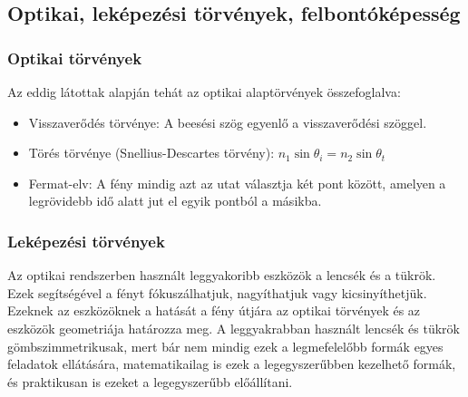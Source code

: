 \documentclass[../main.tex]{subfiles}
\begin{document}
\subsection{Optikai, leképezési törvények, felbontóképesség}
\subsubsection{Optikai törvények}
Az eddig látottak alapján tehát az optikai alaptörvények összefoglalva:
\begin{itemize}
    \item Visszaverődés törvénye: A beesési szög egyenlő a visszaverődési szöggel.
    \item Törés törvénye (Snellius-Descartes törvény): $n_1 \sin \theta_i = n_2 \sin \theta_t$
    \item Fermat-elv: A fény mindig azt az utat választja két pont között, amelyen a legrövidebb idő alatt jut el egyik pontból a másikba.
\end{itemize}

\subsubsection{Leképezési törvények}
Az optikai rendszerben használt leggyakoribb eszközök a lencsék és a tükrök. Ezek segítségével a fényt fókuszálhatjuk, nagyíthatjuk vagy kicsinyíthetjük.
Ezeknek az eszközöknek a hatását a fény útjára az optikai törvények és az eszközök geometriája határozza meg. A leggyakrabban használt lencsék és tükrök gömbszimmetrikusak,
mert bár nem mindig ezek a legmefelelőbb formák egyes feladatok ellátására, matematikailag is ezek a legegyszerűbben kezelhető formák, és praktikusan is ezeket a legegyszerűbb előállítani.
\end{document}
